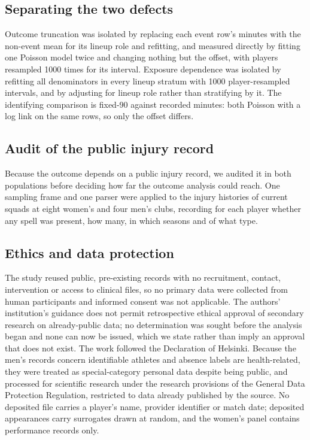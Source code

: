 \documentclass[11pt]{article}
\newcommand{\ethicsinstitution}{The authors' institution's}
\newcommand{\ethicscite}{}
\newcommand{\ethicsinstitution}{Trinity College Dublin}
\newcommand{\ethicscite}{~\cite{tcd2026_ethics_guidance}}
\begin{document}
\subsection{Separating the two defects}

Outcome truncation was isolated by replacing each event row's minutes with the non-event mean for its lineup role and refitting, and measured directly by fitting one Poisson model twice and changing nothing but the offset, with players resampled 1000 times for its interval. Exposure dependence was isolated by refitting all denominators in every lineup stratum with 1000 player-resampled intervals, and by adjusting for lineup role rather than stratifying by it. The identifying comparison is fixed-90 against recorded minutes: both Poisson with a log link on the same rows, so only the offset differs.

\subsection{Audit of the public injury record}

Because the outcome depends on a public injury record, we audited it in both populations before deciding how far the outcome analysis could reach. One sampling frame and one parser were applied to the injury histories of current squads at eight women's and four men's clubs, recording for each player whether any spell was present, how many, in which seasons and of what type.

\subsection{Ethics and data protection}

The study reused public, pre-existing records with no recruitment, contact, intervention or access to clinical files, so no primary data were collected from human participants and informed consent was not applicable. \ethicsinstitution{} guidance does not permit retrospective ethical approval of secondary research on already-public data\ethicscite; no determination was sought before the analysis began and none can now be issued, which we state rather than imply an approval that does not exist. The work followed the Declaration of Helsinki. Because the men's records concern identifiable athletes and absence labels are health-related, they were treated as special-category personal data despite being public, and processed for scientific research under the research provisions of the General Data Protection Regulation, restricted to data already published by the source. No deposited file carries a player's name, provider identifier or match date; deposited appearances carry surrogates drawn at random, and the women's panel contains performance records only.
\end{document}
